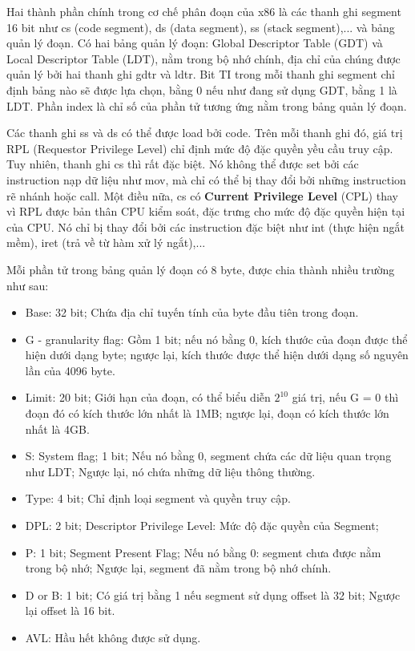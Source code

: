 \documentclass[12pt]{report}
\begin{document}
Hai thành phần chính trong cơ chế phân đoạn của x86 là các thanh ghi segment 16 bit như cs (code segment), ds (data segment), ss (stack segment),... và bảng quản lý đoạn. Có hai bảng quản lý đoạn: Global Descriptor Table (GDT) và Local Descriptor Table (LDT), nằm trong bộ nhớ chính, địa chỉ của chúng được quản lý bởi hai thanh ghi gdtr và ldtr. Bit TI trong mỗi thanh ghi segment chỉ định bảng nào sẽ được lựa chọn, bằng 0 nếu như đang sử dụng GDT, bằng 1 là LDT. Phần index là chỉ số của phần tử tương ứng nằm trong bảng quản lý đoạn. 

Các thanh ghi ss và ds có thể được load bởi code. Trên mỗi thanh ghi đó, giá trị RPL (Requestor Privilege Level) chỉ định mức độ đặc quyền yều cầu truy cập. Tuy nhiên, thanh ghi cs thì rất đặc biệt. Nó không thể được set bởi các instruction nạp dữ liệu như mov, mà chỉ có thể bị thay đổi bởi những instruction rẽ nhánh hoặc call. Một điều nữa, cs có \textbf{Current Privilege Level} (CPL) thay vì RPL được bản thân CPU kiểm soát, đặc trưng cho mức độ đặc quyền hiện tại của CPU. Nó chỉ bị thay đổi bởi các instruction đặc biệt như int (thực hiện ngắt mềm), iret (trả về từ hàm xử lý ngắt),... 

Mỗi phần tử trong bảng quản lý đoạn có 8 byte, được chia thành nhiều trường như sau: 
\begin{itemize}
\item Base: 32 bit; Chứa địa chỉ tuyến tính của byte đầu tiên trong đoạn. 
\item G - granularity flag: Gồm 1 bit; nếu nó bằng 0, kích thước của đoạn được thể hiện dưới dạng byte; ngược lại, kích thước được thể hiện dưới dạng số nguyên lần của 4096 byte. 
\item Limit: 20 bit; Giới hạn của đoạn, có thể biểu diễn $2^{10}$ giá trị, nếu G = 0 thì đoạn đó có kích thước lớn nhất là 1MB; ngược lại, đoạn có kích thước lớn nhất là 4GB.
\item S: System flag; 1 bit; Nếu nó bằng 0, segment chứa các dữ liệu quan trọng như LDT; Ngược lại, nó chứa những dữ liệu thông thường. 
\item Type: 4 bit; Chỉ định loại segment và quyền truy cập.
\item DPL: 2 bit; Descriptor Privilege Level: Mức độ đặc quyền của Segment; 
\item P: 1 bit; Segment Present Flag; Nếu nó bằng 0: segment chưa được nằm trong bộ nhớ; Ngược lại, segment đã nằm trong bộ nhớ chính. 
\item D or B: 1 bit; Có giá trị bằng 1 nếu 	segment sử dụng offset là 32 bit; Ngược lại offset là 16 bit.
\item AVL: Hầu hết không được sử dụng. 
\end{itemize}
\end{document}
